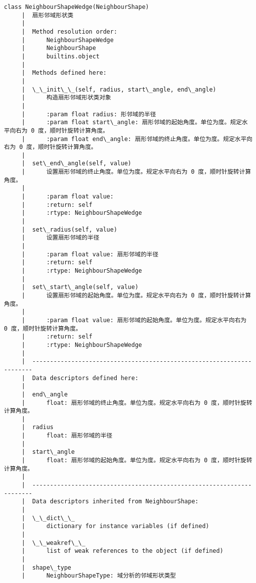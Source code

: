\documentclass[11pt]{article}
\begin{document}
\begin{Verbatim}[commandchars=\\\{\}]
    class NeighbourShapeWedge(NeighbourShape)
     |  扇形邻域形状类
     |  
     |  Method resolution order:
     |      NeighbourShapeWedge
     |      NeighbourShape
     |      builtins.object
     |  
     |  Methods defined here:
     |  
     |  \_\_init\_\_(self, radius, start\_angle, end\_angle)
     |      构造扇形邻域形状类对象
     |      
     |      :param float radius: 形邻域的半径
     |      :param float start\_angle: 扇形邻域的起始角度。单位为度。规定水平向右为 0 度，顺时针旋转计算角度。
     |      :param float end\_angle: 扇形邻域的终止角度。单位为度。规定水平向右为 0 度，顺时针旋转计算角度。
     |  
     |  set\_end\_angle(self, value)
     |      设置扇形邻域的终止角度。单位为度。规定水平向右为 0 度，顺时针旋转计算角度。
     |      
     |      :param float value:
     |      :return: self
     |      :rtype: NeighbourShapeWedge
     |  
     |  set\_radius(self, value)
     |      设置扇形邻域的半径
     |      
     |      :param float value: 扇形邻域的半径
     |      :return: self
     |      :rtype: NeighbourShapeWedge
     |  
     |  set\_start\_angle(self, value)
     |      设置扇形邻域的起始角度。单位为度。规定水平向右为 0 度，顺时针旋转计算角度。
     |      
     |      :param float value: 扇形邻域的起始角度。单位为度。规定水平向右为 0 度，顺时针旋转计算角度。
     |      :return: self
     |      :rtype: NeighbourShapeWedge
     |  
     |  ----------------------------------------------------------------------
     |  Data descriptors defined here:
     |  
     |  end\_angle
     |      float: 扇形邻域的终止角度。单位为度。规定水平向右为 0 度，顺时针旋转计算角度。
     |  
     |  radius
     |      float: 扇形邻域的半径
     |  
     |  start\_angle
     |      float: 扇形邻域的起始角度。单位为度。规定水平向右为 0 度，顺时针旋转计算角度。
     |  
     |  ----------------------------------------------------------------------
     |  Data descriptors inherited from NeighbourShape:
     |  
     |  \_\_dict\_\_
     |      dictionary for instance variables (if defined)
     |  
     |  \_\_weakref\_\_
     |      list of weak references to the object (if defined)
     |  
     |  shape\_type
     |      NeighbourShapeType: 域分析的邻域形状类型
    

\end{Verbatim}
\end{document}
